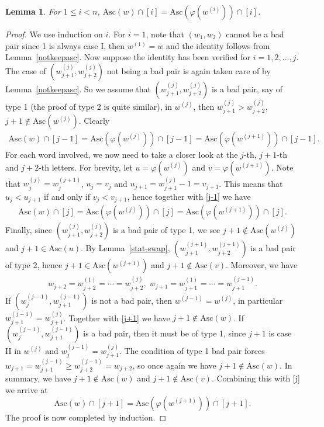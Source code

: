 \documentclass[12pt]{amsart}
\numberwithin{equation}{section}
\theoremstyle{plain}
\newtheorem{lemma}[theorem]{Lemma}
\theoremstyle{definition}
\def\Asc{\mathrm{Asc}}
\begin{document}
\begin{lemma}\label{lemma:Asc}
For $1\le i<n$, $\Asc(w)\cap[i]=\Asc(\varphi(w^{(i)}))\cap[i]$.
\end{lemma}
\begin{proof}
We use induction on $i$. For $i=1$, note that $(w_1,w_2)$ cannot be a bad pair since 1 is always case I, then $w^{(1)}=w$ and the identity follows from Lemma~\ref{notkeepasc}. Now suppose the identity has been verified for $i=1,2,\ldots,j$. The case of $(w^{(j)}_{j+1},w^{(j)}_{j+2})$ not being a bad pair is again taken care of by Lemma~\ref{notkeepasc}. So we assume that $(w^{(j)}_{j+1},w^{(j)}_{j+2})$ is a bad pair, say of type 1 (the proof of type 2 is quite similar), in $w^{(j)}$, then $w^{(j)}_{j+1}>w^{(j)}_{j+2}$, $j+1\notin\Asc(w^{(j)})$. Clearly
\begin{align}\label{j-1}
\Asc(w)\cap[j-1]=\Asc(\varphi(w^{(j)}))\cap[j-1]=\Asc(\varphi(w^{(j+1)}))\cap[j-1].
\end{align}
For each word involved, we now need to take a closer look at the $j$-th, $j+1$-th and $j+2$-th letters. For brevity, let $u=\varphi(w^{(j)})$ and $v=\varphi(w^{(j+1)})$. Note that $w^{(j)}_j=w^{(j+1)}_j$, $u_j=v_j$ and $u_{j+1}=w^{(j)}_{j+1}-1=v_{j+1}$. This means that $u_j<u_{j+1}$ if and only if $v_j<v_{j+1}$, hence together with \eqref{j-1} we have
\begin{align}\label{j}
\Asc(w)\cap[j]=\Asc(\varphi(w^{(j)}))\cap[j]=\Asc(\varphi(w^{(j+1)}))\cap[j].
\end{align}
Finally, since $(w^{(j)}_{j+1},w^{(j)}_{j+2})$ is a bad pair of type 1, we see $j+1\notin\Asc(w^{(j)})$ and $j+1\in\Asc(u)$. By Lemma~\ref{stat-swap}, $(w^{(j+1)}_{j+1},w^{(j+1)}_{j+2})$ is a bad pair of type 2, hence $j+1\in\Asc(w^{(j+1)})$ and $j+1\notin\Asc(v)$. Moreover, we have
\begin{align}\label{j+1}
w_{j+2}=w^{(1)}_{j+2}=\cdots=w^{(j)}_{j+2},\;w_{j+1}=w^{(1)}_{j+1}=\cdots=w^{(j-1)}_{j+1}.
\end{align}
If $(w^{(j-1)}_j,w^{(j-1)}_{j+1})$ is not a bad pair, then $w^{(j-1)}=w^{(j)}$, in particular $w^{(j-1)}_{j+1}=w^{(j)}_{j+1}$. Together with \eqref{j+1} we have $j+1\notin \Asc(w)$. If $(w^{(j-1)}_j,w^{(j-1)}_{j+1})$ is a bad pair, then it must be of type 1, since $j+1$ is case II in $w^{(j)}$ and $w^{(j-1)}_j=w^{(j)}_{j+1}$. The condition of type 1 bad pair forces $w_{j+1}=w^{(j-1)}_{j+1}\ge w^{(j-1)}_{j+2}=w_{j+2}$, so once again we have $j+1\notin\Asc(w)$. In summary, we have $j+1\notin\Asc(w)$ and $j+1\notin\Asc(v)$. Combining this with \eqref{j} we arrive at
$$\Asc(w)\cap[j+1]=\Asc(\varphi(w^{(j+1)}))\cap[j+1].$$
The proof is now completed by induction.
\end{proof}
\end{document}
